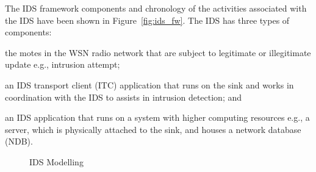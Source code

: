 \documentclass[conference,final]{IEEEtran}
\begin{document}
The IDS framework components and chronology of the activities associated with the IDS have been shown in Figure~\ref{fig:ids_fw}.
The IDS has three types of components:
\begin{inparaenum}
\item the motes in the WSN radio network that are subject to legitimate or illegitimate update e.g., intrusion attempt; 
\item an IDS transport client (ITC) application that runs on the sink and works in coordination with the IDS to assists in intrusion detection; and
\item an IDS application that runs on a system with higher computing resources e.g., a server, which is physically attached to the sink, and houses a network database (NDB).
\end{inparaenum}

\begin{figure}[btp]
    \centering
    \caption{IDS Modelling}
    \label{fig:ids_model}
\end{figure}
\end{document}

